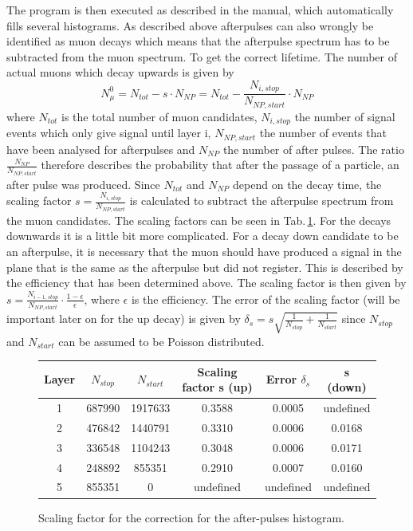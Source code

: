 The program is then executed as described in the manual, which automatically fills several histograms. As described above afterpulses can also wrongly be identified as muon decays which means that the afterpulse spectrum has to be subtracted from the muon spectrum. To get the correct lifetime. 
The number of actual muons which decay upwards is given by
\begin{equation}
	N_\mu^0=N_{tot}-s\cdot N_{NP} = N_{tot} - \frac{N_{i,stop}}{N_{NP,start}}\cdot N_{NP}
\end{equation}
where $N_{tot}$ is the total number of muon candidates, $N_{i,stop}$ the number of signal events which only give signal until layer i, $N_{NP,start}$ the number of events that have been analysed for afterpulses and $N_{NP}$ the number of after pulses. The ratio $\frac{N_{NP}}{N_{NP,start}}$ therefore describes the probability that after the passage of a particle, an after pulse was produced. Since $N_{tot}$ and $N_{NP}$ depend on the decay time, the scaling factor $s = \frac{N_{i,stop}}{N_{NP,start}}$ is calculated to subtract the afterpulse spectrum from the muon candidates. The scaling factors can be seen in Tab.\,\ref{t:scaling}. For the decays downwards it is a little bit more complicated. For a decay down candidate to be an afterpulse, it is necessary that the muon should have produced a signal in the plane that is the same as the afterpulse but did not register. This is described by the efficiency that has been determined above. The scaling factor is then given by $s = \frac{N_{i-1,stop}}{N_{NP,start}}\cdot\frac{1-\epsilon}{\epsilon}$, where $\epsilon$ is the efficiency. The error of the scaling factor (will be important later on for the up decay) is given by $\delta_s = s\sqrt{\frac{1}{N_{stop}}+\frac{1}{N_{start}}}$ since $N_{stop}$ and $N_{start}$ can be assumed to be Poisson distributed. 
 
\begin{figure}
\begin{tabularx}{\textwidth}{ c | c | c | c | c | c }
Layer & $N_{stop}$ & $N_{start}$ & Scaling factor s (up) & Error $\delta_s $ & s (down) \\
\hline
1 & 687990 & 1917633 & 0.3588 & 0.0005 & undefined\\
2 & 476842 & 1440791 & 0.3310 & 0.0006 & 0.0168\\
3 & 336548 & 1104243 & 0.3048 & 0.0006 & 0.0171\\
4 & 248892 & 855351 & 0.2910 & 0.0007 & 0.0160\\
5 & 855351 & 0 & undefined & undefined & undefined
\end{tabularx}
\caption{Scaling factor for the correction for the after-pulses histogram.}
\label{t:scaling}
\end{figure}

